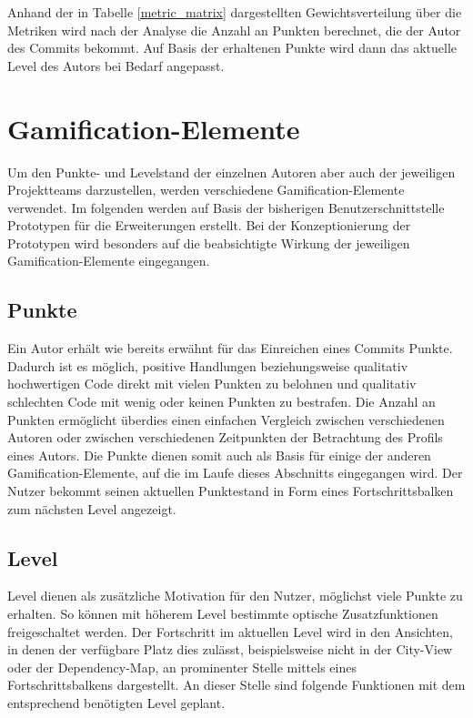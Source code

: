 \documentclass[
	oneside,  %
	ngerman, 
	final, 
	11pt, 
	a4paper, 
	1.1headlines, 
	headinclude=false, 
	footinclude=false, 
	mpinclude=false, 
	pagesize, 
	onecolumn, 
	titlepage, 
	parskip=half, 
	headsepline, 
	chapterprefix=false, 
	version=first, 
	listof=totoc, 
	bibliography=totoc, 
	toc=graduated, 
	fleqn
]{scrbook}
\begin{document}
Anhand der in Tabelle \ref{metric_matrix} dargestellten Gewichtsverteilung über die Metriken wird nach der Analyse die Anzahl an Punkten berechnet, die der Autor des Commits bekommt.
Auf Basis der erhaltenen Punkte wird dann das aktuelle Level des Autors bei Bedarf angepasst.

\section{Gamification-Elemente}
\label{Gamification_Elemente}
Um den Punkte- und Levelstand der einzelnen Autoren aber auch der jeweiligen Projektteams darzustellen, werden verschiedene Gamification-Elemente verwendet.
Im folgenden werden auf Basis der bisherigen Benutzerschnittstelle Prototypen für die Erweiterungen erstellt.
Bei der Konzeptionierung der Prototypen wird besonders auf die beabsichtigte Wirkung der jeweiligen Gamification-Elemente eingegangen.

\subsection{Punkte}
\label{coderadar_Punkte}
Ein Autor erhält wie bereits erwähnt für das Einreichen eines Commits Punkte.
Dadurch ist es möglich, positive Handlungen beziehungsweise qualitativ hochwertigen Code direkt mit vielen Punkten zu belohnen und qualitativ schlechten Code mit wenig oder keinen Punkten zu bestrafen.
Die Anzahl an Punkten ermöglicht überdies einen einfachen Vergleich zwischen verschiedenen Autoren oder zwischen verschiedenen Zeitpunkten der Betrachtung des Profils eines Autors.
Die Punkte dienen somit auch als Basis für einige der anderen Gamification-Elemente, auf die im Laufe dieses Abschnitts eingegangen wird.
Der Nutzer bekommt seinen aktuellen Punktestand in Form eines Fortschrittsbalken zum nächsten Level angezeigt.

\subsection{Level}
\label{coderadar_Level}
Level dienen als zusätzliche Motivation für den Nutzer, möglichst viele Punkte zu erhalten.
So können mit höherem Level bestimmte optische Zusatzfunktionen freigeschaltet werden.
Der Fortschritt im aktuellen Level wird in den Ansichten, in denen der verfügbare Platz dies zulässt, beispielsweise nicht in der City-View oder der Dependency-Map, an prominenter Stelle mittels eines Fortschrittsbalkens dargestellt.
An dieser Stelle sind folgende Funktionen mit dem entsprechend benötigten Level geplant.
\end{document}
